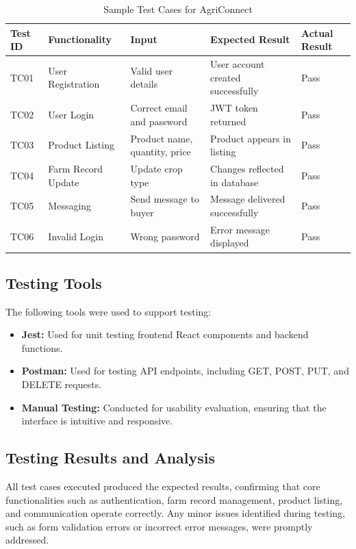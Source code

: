 \documentclass[12pt,a4paper]{article}
\begin{document}
\begin{table}[H]
\centering
\caption{Sample Test Cases for AgriConnect}
\label{tab:testcases}
\begin{tabularx}{\textwidth}{@{}lXlXl@{}}
\toprule
\textbf{Test ID} & \textbf{Functionality} & \textbf{Input} & \textbf{Expected Result} & \textbf{Actual Result} \\ \midrule
TC01 & User Registration & Valid user details & User account created successfully & Pass \\
TC02 & User Login & Correct email and password & JWT token returned & Pass \\
TC03 & Product Listing & Product name, quantity, price & Product appears in listing & Pass \\
TC04 & Farm Record Update & Update crop type & Changes reflected in database & Pass \\
TC05 & Messaging & Send message to buyer & Message delivered successfully & Pass \\
TC06 & Invalid Login & Wrong password & Error message displayed & Pass \\
\bottomrule
\end{tabularx}
\end{table}

\subsection{Testing Tools}

The following tools were used to support testing:

\begin{itemize}
    \item \textbf{Jest:} Used for unit testing frontend React components and backend functions.
    \item \textbf{Postman:} Used for testing API endpoints, including GET, POST, PUT, and DELETE requests.
    \item \textbf{Manual Testing:} Conducted for usability evaluation, ensuring that the interface is intuitive and responsive.
\end{itemize}

\subsection{Testing Results and Analysis}

All test cases executed produced the expected results, confirming that core functionalities such as authentication, farm record management, product listing, and communication operate correctly. Any minor issues identified during testing, such as form validation errors or incorrect error messages, were promptly addressed.
\end{document}
